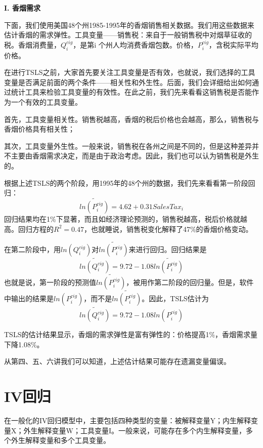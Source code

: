 \documentclass[cn,10pt,math=newtx,citestyle=gb7714-2015,bibstyle=gb7714-2015]{elegantbook}
\begin{document}
	\textbf{I. 香烟需求}
	
	下面，我们使用美国48个州1985-1995年的香烟销售相关数据。我们用这些数据来估计香烟的需求弹性。工具变量——销售税：来自于一般销售税中对烟草征收的税。香烟消费量，$Q_i^{cig}$，是第i 个州人均消费香烟包数。价格，$P_i^{cig}$，含税实际平均价格。
	
	在进行TSLS之前，大家首先要关注工具变量是否有效，也就说，我们选择的工具变量是否满足前面的两个条件——相关性和外生性。后面，我们会详细给出如何通过统计工具来检验工具变量的有效性。在此之前，我们先来看看这销售税是否能作为一个有效的工具变量。
	
	首先，工具变量相关性。销售税越高，香烟的税后价格也会越高，那么，销售税与香烟价格具有相关性；
	
	其次，工具变量外生性。一般来说，销售税在各州之间是不同的，但是这种差异并不主要由香烟需求决定，而是由于政治考虑。因此，我们也可以认为销售税是外生的。
	
	根据上述TSLS的两个阶段，用1995年的48个州的数据，我们先来看看第一阶段回归：
	\begin{equation}
		\tilde{ln(P_i^{cig})}=4.62+0.31SalesTax_i
	\end{equation}
	回归结果均在1\%下显著，而且如经济理论预测的，销售税越高，税后价格就越高。回归方程的$R^2=0.47$，也就睡说，销售税变化解释了47\%的香烟价格变动。
	
	在第二阶段中，用$ln(Q_i^{cig})$对$\tilde{ln(P_i^{cig})}$来进行回归。回归结果是
	\begin{equation}
		\tilde{ln(Q_i^{cig})}=9.72-1.08\tilde{ln(P_i^{cig})}
	\end{equation}
	也就是说，第一阶段的预测值$\tilde{ln(P_i^{cig})}$，被用作第二阶段的回归量。但是，软件中输出的结果是$ln(P_i^{cig})$，而不是$\tilde{ln(P_i^{cig})}$。因此，TSLS估计为
	\begin{equation}
		\tilde{ln(Q_i^{cig})}=9.72-1.08ln(P_i^{cig})
	\end{equation}
	
	TSLS的估计结果显示，香烟的需求弹性是富有弹性的：价格提高1\%，香烟需求量下降1.08\%。
	
	从第四、五、六讲我们可以知道，上述估计结果可能存在遗漏变量偏误。
	
	\section{IV回归}
	在一般化的IV回归模型中，主要包括四种类型的变量：被解释变量Y；内生解释变量X；外生解释变量W；工具变量I。一般来说，可能存在多个内生解释变量，多个外生解释变量和多个工具变量。
	
\end{document}
